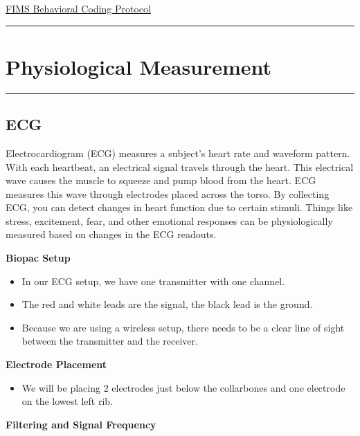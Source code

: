 \documentclass[]{book}
\providecommand{\tightlist}{%
  \setlength{\itemsep}{0pt}\setlength{\parskip}{0pt}}
\begin{document}
\href{https://docs.google.com/document/d/1zd4BD7-yQZxle4bH_cXrEaqFAd3MCVKATnVE1PnWn_4/edit?usp=sharing}{FIMS
Behavioral Coding Protocol}

\begin{center}\rule{0.5\linewidth}{0.5pt}\end{center}

\section{Physiological Measurement}\label{physiological-measurement}

\begin{center}\rule{0.5\linewidth}{0.5pt}\end{center}

\subsection{ECG}\label{ecg}

Electrocardiogram (ECG) measures a subject's heart rate and waveform
pattern. With each heartbeat, an electrical signal travels through the
heart. This electrical wave causes the muscle to squeeze and pump blood
from the heart. ECG measures this wave through electrodes placed across
the torso. By collecting ECG, you can detect changes in heart function
due to certain stimuli. Things like stress, excitement, fear, and other
emotional responses can be physiologically measured based on changes in
the ECG readouts.

\textbf{Biopac Setup}

\begin{itemize}
\tightlist
\item
  In our ECG setup, we have one transmitter with one channel.
\item
  The red and white leads are the signal, the black lead is the ground.
\item
  Because we are using a wireless setup, there needs to be a clear line
  of sight between the transmitter and the receiver.
\end{itemize}

\textbf{Electrode Placement}

\begin{itemize}
\tightlist
\item
  We will be placing 2 electrodes just below the collarbones and one
  electrode on the lowest left rib.
\end{itemize}

\textbf{Filtering and Signal Frequency}
\end{document}
